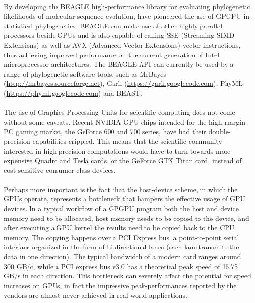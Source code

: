 \paragraph{}
By developing the BEAGLE high-performance library for  evaluating phylogenetic likelihoods of molecular sequence evolution, \cite{Suchard2009} 
have pioneered the use of GPGPU in statistical phylogenetics.
BEAGLE can make use of other highly-parallel processors beside GPUs and is also capable of calling SSE (Streaming SIMD Extensions) as well as AVX (Advanced Vector Extensions) vector instructions, thus achieving improved performance on the current generation of Intel microprocessor architectures.
The BEAGLE API \citep{Ayres2012} can currently be used by a range of phylogenetic software tools, such as MrBayes (\url{http://mrbayes.sourceforge.net}), Garli (\url{https://garli.googlecode.com}), PhyML (\url{https://phyml.googlecode.com}) and BEAST.

\paragraph{}
The use of Graphics Processing Units for scientific computing does not come without some caveats.
Recent NVIDIA GPU chips intended for the high-margin PC gaming market, the GeForce 600 and 700 series, have had their double-precision capabilities crippled.
This means that the scientific community interested in high-precision computations would have to turn towards more expensive Quadro and Tesla cards, or the GeForce GTX Titan card, instead of cost-sensitive consumer-class devices.

\paragraph{}
Perhaps more important is the fact that the host-device scheme, in which the GPUs operate, represents a bottleneck that hampers the effective usage of GPU devices.
In a typical workflow of a GPGPU program both the host and device memory need to be allocated, host memory needs to be copied to the device, and after executing a GPU kernel the results need to be copied back to the CPU memory.
The copying happens over a PCI Express bus, a point-to-point serial interface organized in the form of bi-directional lanes (each lane transmits the data in one direction).
The typical bandwidth of a modern card ranges around $300$ GB/c, while a PCI express bus v3.0 has a theoretical peak speed of 15.75 GB/s in each direction.
This bottleneck can severely affect the potential for speed increases on GPUs, in fact the impressive peak-performances reported by the vendors are almost never achieved in real-world applications.

